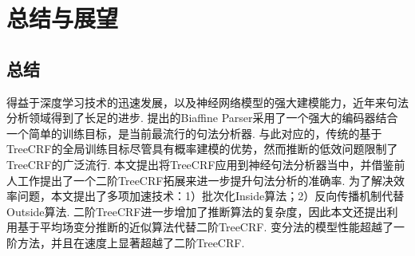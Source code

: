 \chapter{总结与展望}

\section{总结}
得益于深度学习技术的迅速发展，以及神经网络模型的强大建模能力，近年来句法分析领域得到了长足的进步.
\citet{dozat-etal-2017-biaffine}提出的Biaffine Parser采用了一个强大的编码器结合一个简单的训练目标，是当前最流行的句法分析器.
与此对应的，传统的基于TreeCRF的全局训练目标尽管具有概率建模的优势，然而推断的低效问题限制了TreeCRF的广泛流行.
本文提出将TreeCRF应用到神经句法分析器当中，并借鉴前人工作提出了一个二阶TreeCRF拓展来进一步提升句法分析的准确率.
为了解决效率问题，本文提出了多项加速技术：1）批次化Inside算法；2）反向传播机制代替Outside算法.
二阶TreeCRF进一步增加了推断算法的复杂度，因此本文还提出利用基于平均场变分推断的近似算法代替二阶TreeCRF.
变分法的模型性能超越了一阶方法，并且在速度上显著超越了二阶TreeCRF.


